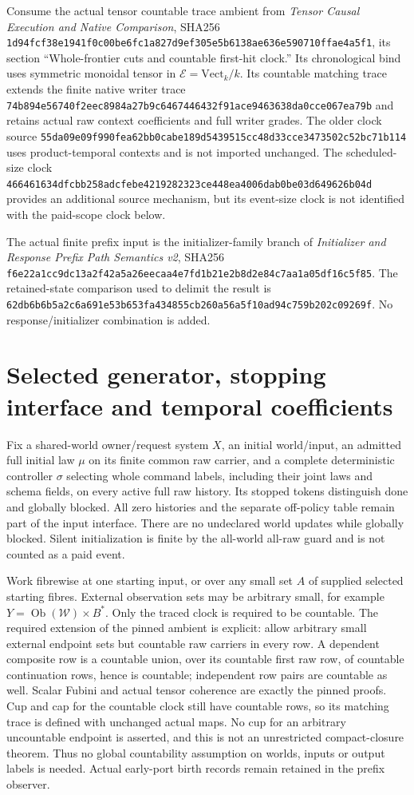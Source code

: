 \documentclass[11pt]{article}\usepackage{amsmath,amssymb,amsthm,geometry}\geometry{margin=1in}\newtheorem{definition}{Definition}\newtheorem{theorem}[definition]{Theorem}\newtheorem{proposition}[definition]{Proposition}
\begin{document}
Consume the actual tensor countable trace ambient from \emph{Tensor Causal Execution and Native Comparison}, SHA256
\texttt{1d94fcf38e1941f0c00be6fc1a827d9ef305e5b6138ae636e590710ffae4a5f1},
its section ``Whole-frontier cuts and countable first-hit clock.'' Its chronological bind uses symmetric monoidal tensor in $\mathcal E=\mathrm{Vect}_k/k$. Its countable matching trace extends the finite native writer trace
\texttt{74b894e56740f2eec8984a27b9c6467446432f91ace9463638da0cce067ea79b}
and retains actual raw context coefficients and full writer grades. The older clock source
\texttt{55da09e09f990fea62bb0cabe189d5439515cc48d33cce3473502c52bc71b114}
uses product-temporal contexts and is not imported unchanged. The scheduled-size clock
\texttt{466461634dfcbb258adcfebe4219282323ce448ea4006dab0be03d649626b04d}
provides an additional source mechanism, but its event-size clock is not identified with the paid-scope clock below.

The actual finite prefix input is the initializer-family branch of \emph{Initializer and Response Prefix Path Semantics v2}, SHA256
\texttt{f6e22a1cc9dc13a2f42a5a26eecaa4e7fd1b21e2b8d2e84c7aa1a05df16c5f85}.
The retained-state comparison used to delimit the result is
\texttt{62db6b6b5a2c6a691e53b653fa434855cb260a56a5f10ad94c759b202c09269f}.
No response/initializer combination is added.

\section{Selected generator, stopping interface and temporal coefficients}
Fix a shared-world owner/request system $X$, an initial world/input, an admitted full initial law $\mu$ on its finite common raw carrier, and a complete deterministic controller $\sigma$ selecting whole command labels, including their joint laws and schema fields, on every active full raw history. Its stopped tokens distinguish done and globally blocked. All zero histories and the separate off-policy table remain part of the input interface. There are no undeclared world updates while globally blocked. Silent initialization is finite by the all-world all-raw guard and is not counted as a paid event.

Work fibrewise at one starting input, or over any small set $A$ of supplied selected starting fibres. External observation sets may be arbitrary small, for example $Y=\operatorname{Ob}(\mathcal W)\times B^*$. Only the traced clock is required to be countable. The required extension of the pinned ambient is explicit: allow arbitrary small external endpoint sets but countable raw carriers in every row. A dependent composite row is a countable union, over its countable first raw row, of countable continuation rows, hence is countable; independent row pairs are countable as well. Scalar Fubini and actual tensor coherence are exactly the pinned proofs. Cup and cap for the countable clock still have countable rows, so its matching trace is defined with unchanged actual maps. No cup for an arbitrary uncountable endpoint is asserted, and this is not an unrestricted compact-closure theorem. Thus no global countability assumption on worlds, inputs or output labels is needed. Actual early-port birth records remain retained in the prefix observer.
\end{document}
